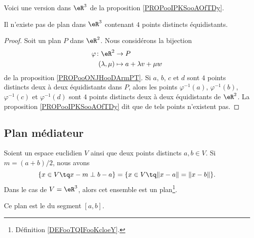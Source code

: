 Voici une version dans \( \eR^3\) de la proposition \ref{PROPooIPKSooAOfTDy}.

\begin{proposition}	\label{PROPooVSOQooMwxHNa}
	Il n'existe pas de plan dans \( \eR^3\) contenant \( 4\) points distincts équidistants.
\end{proposition}

\begin{proof}
	Soit un plan \( P\) dans \( \eR^2\). Nous considérons la bijection
	\begin{equation}
		\begin{aligned}
			\varphi\colon \eR^2 & \to P                     \\
			(\lambda, \mu)      & \mapsto a+\lambda v+\mu w
		\end{aligned}
	\end{equation}
	de la proposition \ref{PROPooONJHooDArmPT}. Si \( a\), \( b\), \( c\) et \( d\) sont \( 4\) points distincts deux à deux équidistants dans \( P\), alors les points \( \varphi^{-1}(a)\), \( \varphi^{-1}(b)\), \( \varphi^{-1}(c)\) et \( \varphi^{-1}(d)\) sont \( 4\) points distincts deux à deux équidistants de \( \eR^2\). La proposition \ref{PROPooIPKSooAOfTDy} dit que de tels points n'existent pas.
\end{proof}

\subsection{Plan médiateur}

\begin{proposition}        \label{PROPooSNUDooTxovMz}
	Soient un espace euclidien \( V\) ainsi que deux points distincts \( a,b\in V\). Si \( m=(a+b)/2\), nous avons
	\begin{equation}
		\{ x\in V\tq x-m\perp b-a \}=\{ x\in V\tq \| x-a \|=\| x-b \| \}.
	\end{equation}
	Dans le cas de \( V=\eR^3\), alors cet ensemble est un plan\footnote{Définition \ref{DEFooTQIFooKcloeY}.}.

	Ce plan est le  du segment \( [a,b]\).
\end{proposition}


